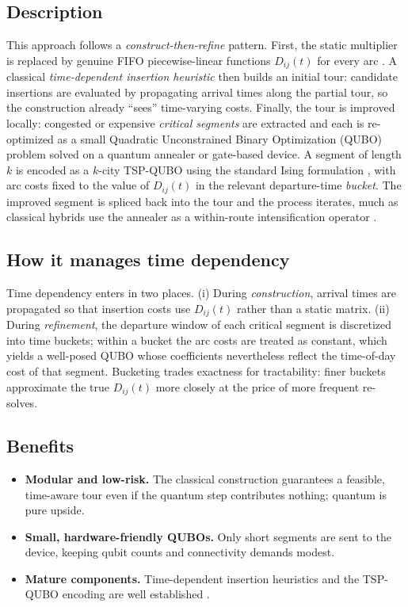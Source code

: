 \documentclass[11pt]{article}
\newcommand{\emphasize}[1]{\textcolor{emphasisblue}{\textit{#1}}}
\newcommand{\emphteal}[1]{\textcolor{emphasisteal}{\textit{#1}}}
\begin{document}
\subsection{Description}
This approach follows a \emphteal{construct-then-refine} pattern. First, the static
multiplier is replaced by genuine FIFO piecewise-linear functions $D_{ij}(t)$ for every
arc \cite{ichoua2003vehicle,ghiani2014note}. A classical \emphasize{time-dependent
insertion heuristic} then builds an initial tour: candidate insertions are evaluated by
propagating arrival times along the partial tour, so the construction already ``sees''
time-varying costs. Finally, the tour is improved locally: congested or expensive
\emphasize{critical segments} are extracted and each is re-optimized as a small
Quadratic Unconstrained Binary Optimization (QUBO) problem solved on a quantum annealer
or gate-based device. A segment of length $k$ is encoded as a $k$-city TSP-QUBO using the
standard Ising formulation \cite{lucas2014ising}, with arc costs fixed to the value of
$D_{ij}(t)$ in the relevant departure-time \emph{bucket}. The improved segment is spliced
back into the tour and the process iterates, much as classical hybrids use the annealer as
a within-route intensification operator \cite{feld2019hybrid,holliday2025advanced}.

\subsection{How it manages time dependency}
Time dependency enters in two places. (i) During \emph{construction}, arrival times are
propagated so that insertion costs use $D_{ij}(t)$ rather than a static matrix. (ii)
During \emph{refinement}, the departure window of each critical segment is discretized
into time buckets; within a bucket the arc costs are treated as constant, which yields a
well-posed QUBO whose coefficients nevertheless reflect the time-of-day cost of that
segment. Bucketing trades exactness for tractability: finer buckets approximate the true
$D_{ij}(t)$ more closely at the price of more frequent re-solves.

\subsection{Benefits}
\begin{itemize}[leftmargin=1.4em]
  \item \textbf{Modular and low-risk.} The classical construction guarantees a feasible,
        time-aware tour even if the quantum step contributes nothing; quantum is pure
        upside.
  \item \textbf{Small, hardware-friendly QUBOs.} Only short segments are sent to the
        device, keeping qubit counts and connectivity demands modest.
  \item \textbf{Mature components.} Time-dependent insertion heuristics and the TSP-QUBO
        encoding are well established \cite{gendreau2015time,lucas2014ising}.
\end{itemize}
\end{document}
